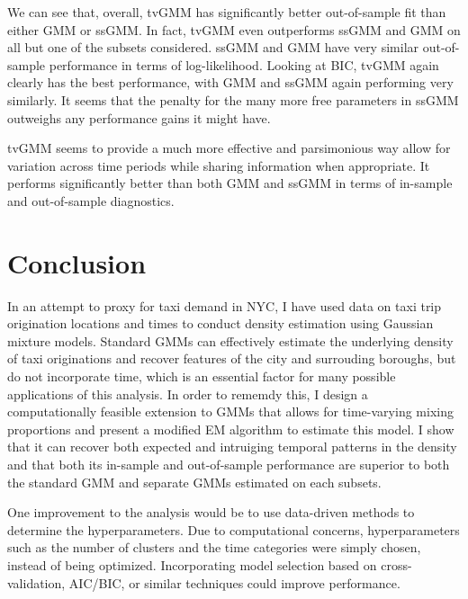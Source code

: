 \documentclass[12pt]{article}
\theoremstyle{definition}
\theoremstyle{algodesc}
\begin{document}
We can see that, overall, tvGMM has significantly better out-of-sample fit than either GMM or ssGMM. In fact, tvGMM even outperforms ssGMM and GMM on all but one of the subsets considered. ssGMM and GMM have very similar out-of-sample performance in terms of log-likelihood. Looking at BIC, tvGMM again clearly has the best performance, with GMM and ssGMM again performing very similarly. It seems that the penalty for the many more free parameters in ssGMM outweighs any performance gains it might have.

tvGMM seems to provide a much more effective and parsimonious way allow for variation across time periods while sharing information when appropriate. It performs significantly better than both GMM and ssGMM in terms of in-sample and out-of-sample diagnostics.


\section{Conclusion}
In an attempt to proxy for taxi demand in NYC, I have used data on taxi trip origination locations and times to conduct density estimation using Gaussian mixture models. Standard GMMs can effectively estimate the underlying density of taxi originations and recover features of the city and surrouding boroughs, but do not incorporate time, which is an essential factor for many possible applications of this analysis. In order to rememdy this, I design a computationally feasible extension to GMMs that allows for time-varying mixing proportions and present a modified EM algorithm to estimate this model. I show that it can recover both expected and intruiging temporal patterns in the density and that both its in-sample and out-of-sample performance are superior to both the standard GMM and separate GMMs estimated on each subsets.

One improvement to the analysis would be to use data-driven methods to determine the hyperparameters. Due to computational concerns, hyperparameters such as the number of clusters and the time categories were simply chosen, instead of being optimized. Incorporating model selection based on cross-validation, AIC/BIC, or similar techniques could improve performance.
\end{document}
